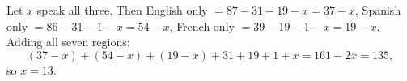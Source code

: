 Let $x$ speak all three. Then English only $=87-31-19-x=37-x$, Spanish only $=86-31-1-x=54-x$, French only $=39-19-1-x=19-x$. Adding all seven regions:
\[(37-x)+(54-x)+(19-x)+31+19+1+x=161-2x=135,\]
so $x=\boxed{13}$.

